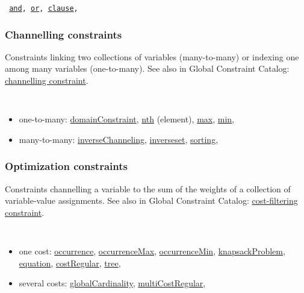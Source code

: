 \vspace{1em}\noindent\begin{notedef}\tt
\hyperlink{and:andconstraint}{and},
\hyperlink{or:orconstraint}{or},
\hyperlink{clause:clauseconstraint}{clause},
\end{notedef}

\subsubsection{Channelling constraints}\label{model:channellingconstraints}\hypertarget{model:channellingconstraints}{}
Constraints linking two collections of variables (many-to-many) or indexing one among many variables (one-to-many).
See also in Global Constraint Catalog: \href{http://www.emn.fr/x-info/sdemasse/gccat/Kchannelling_constraint.html}{channelling constraint}.

 \vspace{1em}\noindent\begin{notedef}\tt
   \begin{itemize}
   \item one-to-many: 
 \hyperlink{domainconstraint:domainconstraintconstraint}{domainConstraint},
 \hyperlink{nth:nthconstraint}{nth} (element),
 \hyperlink{max:maxconstraint}{max},
 \hyperlink{min:minconstraint}{min},
   \item many-to-many: 
 \hyperlink{inversechanneling:inversechannelingconstraint}{inverseChanneling},
 \hyperlink{inverseset:inversesetconstraint}{inverseset},
 \hyperlink{sorting:sortingconstraint}{sorting},
 \end{itemize}
 \end{notedef}

\subsubsection{Optimization constraints}\label{model:optimizationconstraints}\hypertarget{model:optimizationconstraints}{}
Constraints channelling a variable to the sum of the weights of a collection of variable-value assignments.
See also in Global Constraint Catalog: \href{http://www.emn.fr/x-info/sdemasse/gccat/Kcost_filtering_constraint.html}{cost-filtering constraint}.
\vspace{1em}\noindent\begin{notedef}\tt
 \begin{itemize}
  \item one cost: 
\hyperlink{occurrence:occurrenceconstraint}{occurrence},
\hyperlink{occurrencemax:occurrencemaxconstraint}{occurrenceMax},
\hyperlink{occurrencemin:occurrenceminconstraint}{occurrenceMin},
\hyperlink{knapsackproblem:knapsackproblemconstraint}{knapsackProblem},
\hyperlink{equation:equationconstraint}{equation},
\hyperlink{costregular:costregularconstraint}{costRegular},
\hyperlink{tree:treeconstraint}{tree},
 \item several costs:
\hyperlink{globalcardinality:globalcardinalityconstraint}{globalCardinality},
\hyperlink{multicostregular:multicostregularconstraint}{multiCostRegular}, 
 \end{itemize}
\end{notedef}

